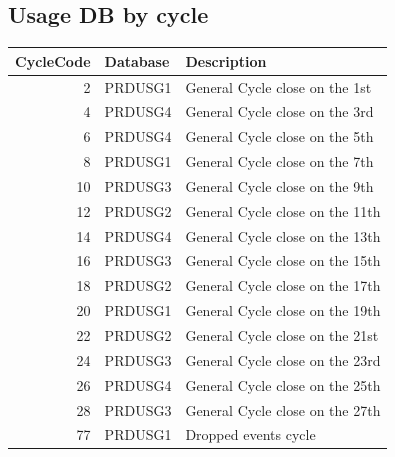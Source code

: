 \documentclass[12pt,twoside]{article}
\begin{document}
\normalsize
\subsection{Usage DB by cycle}
\label{sec-8-1}

\footnotesize

\begin{center}
\begin{tabular}{rll}
\hline
 \textbf{CycleCode}  &  \textbf{Database}  &  \textbf{Description}                             \\
\hline
                  2  &  PRDUSG1            &  General Cycle close on the 1st                   \\
                  4  &  PRDUSG4            &  General Cycle close on the 3rd                   \\
                  6  &  PRDUSG4            &  General Cycle close on the 5th                   \\
                  8  &  PRDUSG1            &  General Cycle close on the 7th                   \\
                 10  &  PRDUSG3            &  General Cycle close on the 9th                   \\
                 12  &  PRDUSG2            &  General Cycle close on the 11th                  \\
                 14  &  PRDUSG4            &  General Cycle close on the 13th                  \\
                 16  &  PRDUSG3            &  General Cycle close on the 15th                  \\
                 18  &  PRDUSG2            &  General Cycle close on the 17th                  \\
                 20  &  PRDUSG1            &  General Cycle close on the 19th                  \\
                 22  &  PRDUSG2            &  General Cycle close on the 21st                  \\
                 24  &  PRDUSG3            &  General Cycle close on the 23rd                  \\
                 26  &  PRDUSG4            &  General Cycle close on the 25th                  \\
                 28  &  PRDUSG3            &  General Cycle close on the 27th                  \\
                 77  &  PRDUSG1            &  Dropped events cycle                             \\

\end{tabular}
\end{center}
\end{document}
